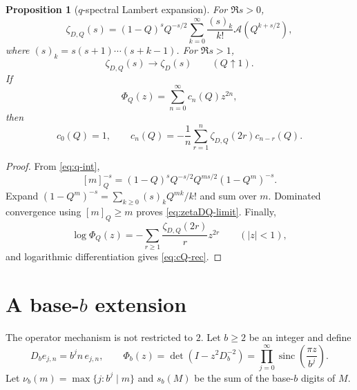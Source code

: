 \documentclass[11pt,oneside]{article}
\numberwithin{equation}{section}
\theoremstyle{plain}
\newtheorem{proposition}[theorem]{Proposition}
\theoremstyle{definition}
\theoremstyle{remark}
\newcommand{\sinc}{\operatorname{sinc}}
\newcommand{\Acal}{\mathcal A}
\begin{document}
\begin{proposition}[$q$-spectral Lambert expansion]\label{prop:zetaDQ}
For $\Re s>0$,
\begin{equation}\label{eq:zetaDQ-Lambert}
 \boxed{\ \zeta_{D,Q}(s)
 =(1-Q)^sQ^{-s/2}
 \sum_{k=0}^{\infty}\frac{(s)_k}{k!}
 \Acal\!\left(Q^{k+s/2}\right),\ }
\end{equation}
where $(s)_k=s(s+1)\cdots(s+k-1)$.  For $\Re s>1$,
\begin{equation}\label{eq:zetaDQ-limit}
 \zeta_{D,Q}(s)\longrightarrow\zeta_D(s)
 \qquad(Q\uparrow1).
\end{equation}
If
\[
 \Phi_Q(z)=\sum_{n=0}^{\infty}c_n(Q)z^{2n},
\]
then
\begin{equation}\label{eq:cQ-rec}
 c_0(Q)=1,
 \qquad
 c_n(Q)=-\frac1n\sum_{r=1}^{n}
 \zeta_{D,Q}(2r)c_{n-r}(Q).
\end{equation}
\end{proposition}

\begin{proof}
From \cref{eq:q-int},
\[
 [m]_Q^{-s}=(1-Q)^sQ^{-s/2}
 Q^{ms/2}(1-Q^m)^{-s}.
\]
Expand $(1-Q^m)^{-s}=\sum_{k\ge0}(s)_kQ^{mk}/k!$ and sum over $m$.  Dominated convergence using $[m]_Q\ge m$ proves \cref{eq:zetaDQ-limit}.  Finally,
\[
 \log\Phi_Q(z)=-\sum_{r\ge1}\frac{\zeta_{D,Q}(2r)}r z^{2r}
 \qquad(|z|<1),
\]
and logarithmic differentiation gives \cref{eq:cQ-rec}.
\end{proof}

\section{A base-$b$ extension}

The operator mechanism is not restricted to $2$.  Let $b\ge2$ be an integer and define
\begin{equation}\label{eq:Db}
 D_b e_{j,n}=b^jn\,e_{j,n},
 \qquad
 \Phi_b(z)=\det(I-z^2D_b^{-2})
 =\prod_{j=0}^{\infty}\sinc\!\left(\frac{\pi z}{b^j}\right).
\end{equation}
Let $\nu_b(m)=\max\{j:b^j\mid m\}$ and $s_b(M)$ be the sum of the base-$b$ digits of $M$.
\end{document}
